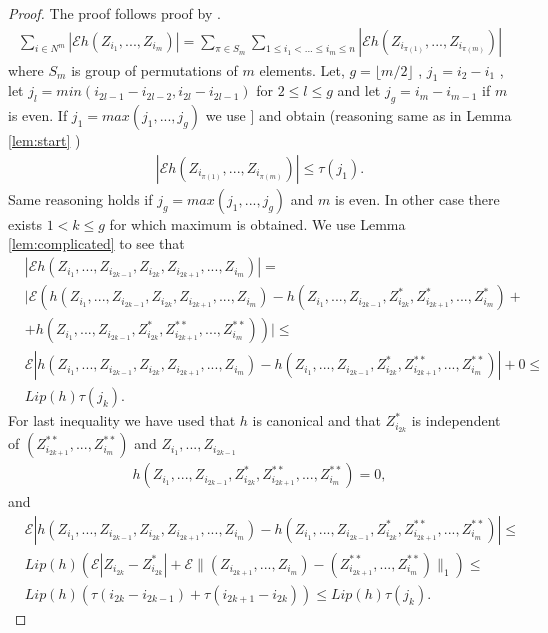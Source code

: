 \documentclass{article} %
\newcommand{\ev}{\mathcal{E}}
\begin{document}
\begin{proof}
 The proof follows proof by \cite[Lemma 3]{arcones1998law}. 
\begin{align}
 \sum_{i \in N^{m}} |\ev   h(Z_{i_1},...,Z_{i_m})| = \sum_{\pi \in S_m} \sum_{1 \leq i_1< ...\leq i_m \leq n} |\ev   h(Z_{i_{\pi(1)}},...,Z_{i_{\pi(m)}})|
\end{align}
 where $S_m$ is group of permutations of $m$ elements.  Let, $g=\lfloor m/2 \rfloor$ , $j_1 = i_2 - i_1$ , let $j_l = min(i_{2l-1} - i_{2l-2} , i_{2l} - i_{2l-1} )$ for $2 \leq l \leq g$  and let $j_g = i_m - i_{m-1}$ if $m$ is even. If $j_1=max(j_1,...,j_g)$ we use \cite[Equation 2.1]{leucht_dependent_2013}] and obtain (reasoning same as in Lemma \ref{lem:start} )
 \begin{align}
  |\ev   h(Z_{i_{\pi(1)}},...,Z_{i_{\pi(m)}})| \leq \tau(j_1). 
 \end{align}
Same reasoning holds if $j_g = max(j_1,...,j_g)$ and $m$ is even. In other case there exists $1 < k \leq g$ for which maximum is obtained.  We use Lemma \ref{lem:complicated} to see that 
\begin{align}
&  |\ev   h(Z_{i_1},...,Z_{i_{2k-1}},Z_{i_{2k}},Z_{i_{2k+1}},...,Z_{i_m})| = \\ 
&  | \ev \left( h(Z_{i_1},...,Z_{i_{2k-1}},Z_{i_{2k}},Z_{i_{2k+1}},...,Z_{i_m}) - h(Z_{i_1},...,Z_{i_{2k-1}},Z_{i_{2k}}^*,Z_{i_{2k+1}}^*,...,Z_{i_m}^*)+ \right. \\
& \left. +h(Z_{i_1},...,Z_{i_{2k-1}},Z_{i_{2k}}^*,Z_{i_{2k+1}}^{**},...,Z_{i_m}^{**}) \right) | \leq\\
&   \ev  |h(Z_{i_1},...,Z_{i_{2k-1}},Z_{i_{2k}},Z_{i_{2k+1}},...,Z_{i_m}) - h(Z_{i_1},...,Z_{i_{2k-1}},Z_{i_{2k}}^*,Z_{i_{2k+1}}^{**},...,Z_{i_m}^{**})| + 0 \leq \\
&Lip(h)  \tau(j_k).
\end{align}
For last inequality we have used that $h$ is canonical and that $Z_{i_{2k}}^*$ is independent of $(Z_{i_{2k+1}}^{**},...,Z_{i_m}^{**})$ and $Z_{i_1},...,Z_{i_{2k-1}}$
\begin{align}
 h(Z_{i_1},...,Z_{i_{2k-1}},Z_{i_{2k}}^*,Z_{i_{2k+1}}^{**},...,Z_{i_m}^{**}) = 0,
\end{align}
and 
\begin{align}
&\ev |h(Z_{i_1},...,Z_{i_{2k-1}},Z_{i_{2k}},Z_{i_{2k+1}},...,Z_{i_m}) - h(Z_{i_1},...,Z_{i_{2k-1}},Z_{i_{2k}}^*,Z_{i_{2k+1}}^{**},...,Z_{i_m}^{**})| \leq \\
& Lip(h) \left( \ev |Z_{i_{2k}} - Z_{i_{2k}}^{*}| + \ev \parallel (Z_{i_{2k+1}},...,Z_{i_m})- (Z_{i_{2k+1}}^{**},...,Z_{i_m}^{**}) \parallel_1  \right) \leq \\
&Lip(h)  \left( \tau(i_{2k}-i_{2k-1}) + \tau(i_{2k+1}-i_{2k})   \right) \leq Lip(h)  \tau(j_k). 
\end{align}


\end{proof}
\end{document}
